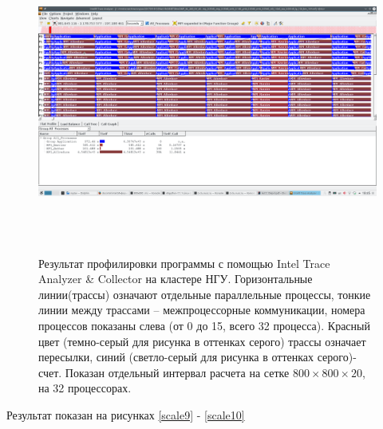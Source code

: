 \begin{figure}[h]
\begin{center}
\includegraphics[height=10cm,keepaspectratio]{images/scalingNSU-img17.png}
\caption{
Результат профилировки программы с помощью Intel Trace Analyzer \& Collector на кластере НГУ. Горизонтальные линии(трассы) означают отдельные параллельные процессы, тонкие линии между трассами – межпроцессорные коммуникации, номера процессов показаны слева (от 0 до 15, всего 32 процесса). Красный цвет (темно-серый для рисунка в оттенках серого) трассы означает пересылки, синий (светло-серый для рисунка в оттенках серого)-счет. Показан отдельный интервал расчета на сетке $800\times800\times20$, на 32 процессорах.
}
\label{scale8}
\end{center} 
\end{figure}
	   
	   
	    Результат показан на рисунках \ref{scale9} - \ref{scale10}
	    
